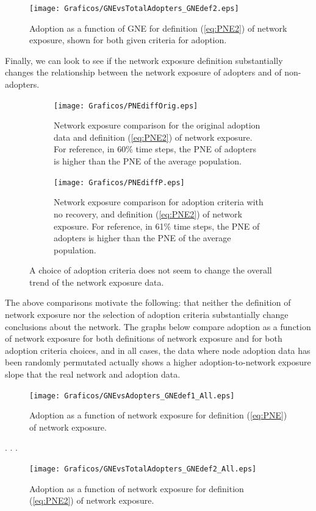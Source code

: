 \documentclass[12pt]{article}
\begin{document}
\begin{figure}[H]
\texttt{[image: Graficos/GNEvsTotalAdopters\_GNEdef2.eps]}
\caption{Adoption as a function of GNE for definition (\ref{eq:PNE2}) of network exposure, shown for both given criteria for adoption.}
\end{figure}

\newpage

Finally, we can look to see if the network exposure definition substantially changes the relationship between the network exposure of adopters and of non-adopters.

\begin{figure}[H]
    \begin{subfigure}[h]{.55\textwidth}
        \centering
        \texttt{[image: Graficos/PNEdiffOrig.eps]}
        \caption{Network exposure comparison for the original adoption data and definition (\ref{eq:PNE2}) of network exposure. For reference, in 60\% time steps, the PNE of adopters is higher than the PNE of the average population.}
    \end{subfigure}
    \begin{subfigure}[h]{.55\textwidth}
        \centering
	\texttt{[image: Graficos/PNEdiffP.eps]}
        \caption{Network exposure comparison for adoption criteria with no recovery, and definition (\ref{eq:PNE2}) of network exposure. For reference, in 61\% time steps, the PNE of adopters is higher than the PNE of the average population.}
    \end{subfigure}
    \caption{A choice of adoption criteria does not seem to change the overall trend of the network exposure data.}
\end{figure}

The above comparisons motivate the following: that neither the definition of network exposure nor the selection of adoption criteria substantially change conclusions about the network. The graphs below compare adoption as a function of network exposure for both definitions of network exposure and for both adoption criteria choices, and in all cases, the data where node adoption data has been randomly permutated actually shows a higher adoption-to-network exposure slope that the real network and adoption data.



\begin{figure}[H]
\texttt{[image: Graficos/GNEvsAdopters\_GNEdef1\_All.eps]}
\caption{Adoption as a function of network exposure for definition (\ref{eq:PNE}) of network exposure.}
\end{figure}

.
\newline .
\newline .

\begin{figure}[H]
\texttt{[image: Graficos/GNEvsTotalAdopters\_GNEdef2\_All.eps]}
\caption{Adoption as a function of network exposure for definition (\ref{eq:PNE2}) of network exposure.}
\end{figure}
\end{document}
